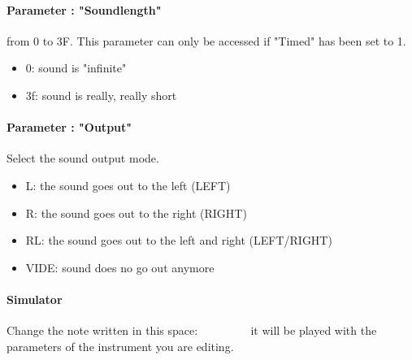 \paragraph{Parameter : "Soundlength"} from 0 to 3F.
This parameter can only be accessed if "Timed" has been set to 1.
\medskip

\begin{itemize}
    \item{0: sound is "infinite"}
    \item{3f: sound is really, really short}
\end{itemize}

\paragraph{Parameter : "Output"} Select the sound output mode.
\medskip

\begin{itemize}
    \item{L: the sound goes out to the left (LEFT)}
    \item{R: the sound goes out to the right (RIGHT)}
    \item{RL: the sound goes out to the left and right (LEFT/RIGHT)}
    \item{VIDE: sound does no go out anymore}
\end{itemize}

\paragraph{Simulator} Change the note written in this space:
         it will be played with the parameters of the instrument you are editing.
